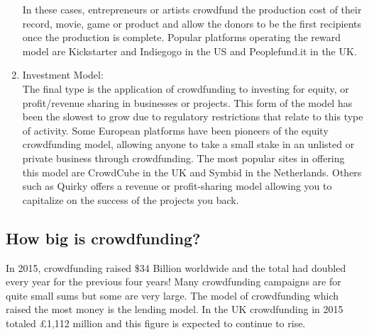 \begin{enumerate}
            In these cases, entrepreneurs or artists crowdfund the production cost of their record, movie, game or product and allow the donors to be the first recipients once the production is complete. Popular platforms operating the reward model are Kickstarter and Indiegogo in the US and Peoplefund.it in the UK.
      \item Investment Model:\\
            The final type is the application of crowdfunding to investing for equity, or profit/revenue sharing in businesses or projects. This form of the model has been the slowest to grow due to regulatory restrictions that relate to this type of activity. Some European platforms have been pioneers of the equity crowdfunding model, allowing anyone to take a small stake in an unlisted or private business through crowdfunding. The most popular sites in offering this model are CrowdCube in the UK and Symbid in the Netherlands. Others such as
            Quirky offers a revenue or profit-sharing model allowing you to capitalize on the success of the projects you back.
\end{enumerate}


\subsection*{ How big is crowdfunding? }
In 2015, crowdfunding raised \$34 Billion worldwide and the total had doubled every year for the previous four years! Many crowdfunding campaigns are for quite small sums but some are very large. The model of crowdfunding which raised the most money is the lending model. In the UK crowdfunding in 2015 totaled £1,112 million and this figure is expected to continue to rise.


